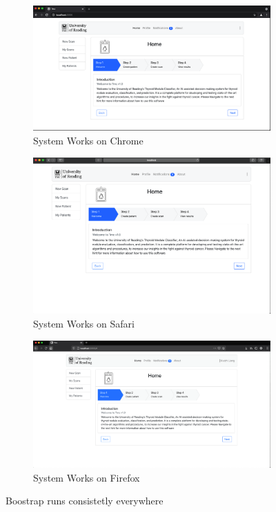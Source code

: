 			\begin{figure}[H]
				\centering
				\begin{subfigure}[b]{0.45\linewidth}
					\includegraphics[width=\linewidth]{figures/tmc-runs-chrome}
					\caption{System Works on Chrome}\label{fig:mouse}
				\end{subfigure}
				
				\begin{subfigure}[b]{0.45\linewidth}
					\includegraphics[width=\linewidth]{figures/tmc-runs-safari}
					\caption{System Works on Safari}\label{fig:gull}
				\end{subfigure}
				\begin{subfigure}[b]{0.45\linewidth}
					\includegraphics[width=\linewidth]{figures/tmc-runs-firefox}
					\caption{System Works on Firefox}\label{fig:tiger}
				\end{subfigure}
				\caption{Boostrap runs consistetly everywhere}
				\label{fig:animals}
			\end{figure}
